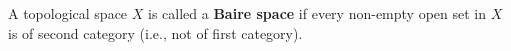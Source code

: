A topological space $X$ is called a \textbf{Baire space} if every non-empty open set in $X$ is of second category (i.e., not of first category).
